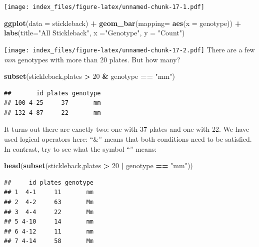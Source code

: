 \documentclass[]{article}
\newenvironment{Shaded}{\begin{snugshade}}{\end{snugshade}}
\newcommand{\DataTypeTok}[1]{\textcolor[rgb]{0.13,0.29,0.53}{#1}}
\newcommand{\DecValTok}[1]{\textcolor[rgb]{0.00,0.00,0.81}{#1}}
\newcommand{\KeywordTok}[1]{\textcolor[rgb]{0.13,0.29,0.53}{\textbf{#1}}}
\newcommand{\NormalTok}[1]{#1}
\newcommand{\OperatorTok}[1]{\textcolor[rgb]{0.81,0.36,0.00}{\textbf{#1}}}
\newcommand{\StringTok}[1]{\textcolor[rgb]{0.31,0.60,0.02}{#1}}
\begin{document}
\texttt{[image: index\_files/figure-latex/unnamed-chunk-17-1.pdf]}

\begin{Shaded}
\begin{Highlighting}[]
\KeywordTok{ggplot}\NormalTok{(}\DataTypeTok{data =}\NormalTok{ stickleback) }\OperatorTok{+}\StringTok{ }
\StringTok{  }\KeywordTok{geom_bar}\NormalTok{(}\DataTypeTok{mapping=} \KeywordTok{aes}\NormalTok{(}\DataTypeTok{x =}\NormalTok{ genotype)) }\OperatorTok{+}
\StringTok{  }\KeywordTok{labs}\NormalTok{(}\DataTypeTok{title=}\StringTok{"All Stickleback"}\NormalTok{,}
        \DataTypeTok{x =}\StringTok{"Genotype"}\NormalTok{, }\DataTypeTok{y =} \StringTok{"Count"}\NormalTok{)}
\end{Highlighting}
\end{Shaded}

\texttt{[image: index\_files/figure-latex/unnamed-chunk-17-2.pdf]} There
are a few \emph{mm} genotypes with more than 20 plates. But how many?

\begin{Shaded}
\begin{Highlighting}[]
\KeywordTok{subset}\NormalTok{(stickleback,plates }\OperatorTok{>}\StringTok{ }\DecValTok{20} \OperatorTok{&}\StringTok{ }\NormalTok{genotype }\OperatorTok{==}\StringTok{ "mm"}\NormalTok{)}
\end{Highlighting}
\end{Shaded}

\begin{verbatim}
##       id plates genotype
## 100 4-25     37       mm
## 132 4-87     22       mm
\end{verbatim}

It turns out there are exactly two: one with 37 plates and one with 22.
We have used logical operators here: ``\&'' means that both conditions
need to be satisfied. In contrast, try to see what the symbol
``\textbar{}'' means:

\begin{Shaded}
\begin{Highlighting}[]
\KeywordTok{head}\NormalTok{(}\KeywordTok{subset}\NormalTok{(stickleback,plates }\OperatorTok{>}\StringTok{ }\DecValTok{20} \OperatorTok{|}\StringTok{ }\NormalTok{genotype }\OperatorTok{==}\StringTok{ "mm"}\NormalTok{))}
\end{Highlighting}
\end{Shaded}

\begin{verbatim}
##     id plates genotype
## 1  4-1     11       mm
## 2  4-2     63       Mm
## 3  4-4     22       Mm
## 5 4-10     14       mm
## 6 4-12     11       mm
## 7 4-14     58       Mm
\end{verbatim}
\end{document}
